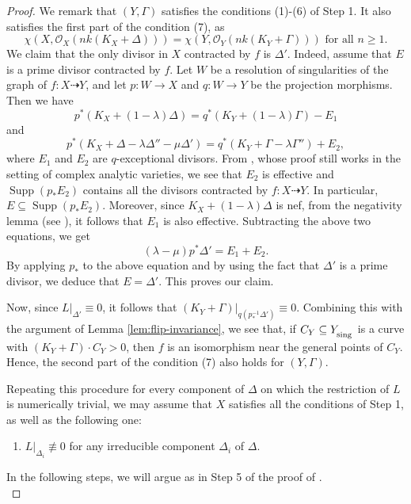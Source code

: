 \documentclass[12pt]{amsart}
\newcommand{\<}{\leq}
\def\>{\geq}
\def\subset{\subseteq}
\newcommand{\bir}{\dashrightarrow}
\newcommand{\D}{\Delta}
\def\mcO{\mathcal{O}}
\theoremstyle{remark}
\theoremstyle{definition}
\theoremstyle{definition}
\numberwithin{equation}{section}
\theoremstyle{definition}
\theoremstyle{definition}
\def\Supp{\operatorname{Supp}}
\def\sing{\operatorname{\textsubscript{\rm sing}}}
\begin{document}
\begin{proof}



We  remark that   $(Y,\Gamma)$ 
satisfies the conditions (1)-(6) of Step 1.  
It also satisfies the first part of the condition (7), as 
\[
\chi(X,\mcO_X({nk(K_X+\D)})) = \chi(Y,\mcO_Y({nk(K_Y+\Gamma)}))\mbox{ for all } n\>1.  
\]
We claim that the only divisor in $X$ contracted by $f$ is $\D'$. 
Indeed, assume that $E$ is a prime divisor contracted by $f$.  
Let $W$ be a resolution of singularities of the graph of $f:X\bir Y$, 
and let $p\colon W\to X$ and $q\colon W\to Y$ be the projection morphisms. 
Then we have   
\[
p^*(K_X+(1-\lambda)\D) = q^*(K_Y+(1-\lambda)\Gamma) - E_1
\]
and 
\[
p^*(K_X+\Delta - \lambda \D'' - \mu \D') = q^*(K_Y+\Gamma - \lambda \Gamma'') + E_2,
\]
where $E_1$ and $E_2$ are $q$-exceptional divisors. 
From \cite[Lemma 3.38]{KM98}, whose proof still works in the setting of complex  analytic varieties, 
we see that $E_2$ is effective and $\Supp(p_*E_2)$ contains all the divisors contracted by $f:X\bir Y$.    
In particular, $E\subset \Supp(p_*E_2)$. 
Moreover, since $K_X+(1-\lambda)\D$ is nef, from the negativity lemma (see \cite[Lemma 3.39]{KM98}), 
it follows that $E_1$ is also effective. 
Subtracting the above two equations, we get 
\[
(\lambda-\mu)p^*\D'  = E_1 + E_2.  
\]
By applying $p_*$ to the above equation and by using the fact that $\Delta'$ is a prime divisor, we deduce that $E=\D'$. 
This proves our claim. 

Now, since $L|_{\D'} \equiv 0$, it follows  that $(K_Y+\Gamma)|_{q(p^{-1}_*{\D'})} \equiv 0$.  
Combining this with the argument of Lemma \ref{lem:flip-invariance}, we see that, 
if $C_Y \subseteq Y_{\sing}$ is a curve with $(K_Y+\Gamma)\cdot C_Y>0$, then $f$ is an isomorphism near the general points of $C_Y$. 
Hence, the second part of the condition (7) also holds for $(Y,\Gamma)$. 

Repeating this procedure for every component  of $\Delta$  on which the restriction  of $L$ is numerically trivial,  
we may assume that $X$ satisfies  all the conditions of Step 1, as well as  the following one:  
\begin{enumerate}
    \item[(8)] $L|_{\Delta_i} \not\equiv 0$ for any irreducible component $\Delta_i$ of $\Delta$.
\end{enumerate}
In the following steps,  we will argue as in Step 5 of the proof of \cite[Theorem 8.2]{CHP16}. \\



\end{proof}
\end{document}
